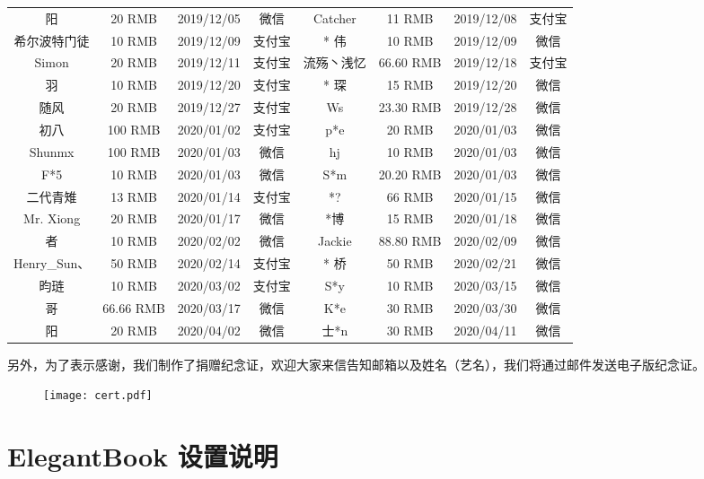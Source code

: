 \documentclass[cn,11pt]{elegantbook}
\begin{document}
\begin{table}[!htb]
\begin{tabular}{*{4}{>{\scriptsize}c}|*{4}{>{\scriptsize}c}}
    * 阳   & 20 RMB & 2019/12/05 & 微信    & Catcher & 11 RMB & 2019/12/08 & 支付宝 \\
    希尔波特门徒 & 10 RMB & 2019/12/09 & 支付宝   & * 伟   & 10 RMB & 2019/12/09 & 微信 \\
    Simon & 20 RMB & 2019/12/11 & 支付宝   & 流殇丶浅忆 & 66.60 RMB & 2019/12/18 & 支付宝 \\
    羽     & 10 RMB & 2019/12/20 & 支付宝   & * 琛   & 15 RMB & 2019/12/20 & 微信 \\
    随风    & 20 RMB & 2019/12/27 & 支付宝   & Ws    & 23.30 RMB & 2019/12/28 & 微信 \\
    初八    & 100 RMB  & 2020/01/02 & 支付宝   & p*e   & 20 RMB & 2020/01/03 & 微信 \\
    Shunmx & 100 RMB & 2020/01/03 & 微信    & hj    & 10 RMB & 2020/01/03 & 微信 \\
    F*5   & 10 RMB & 2020/01/03 & 微信    & S*m   & 20.20 RMB & 2020/01/03 & 微信 \\
    二代青雉  & 13 RMB & 2020/01/14 & 支付宝   & *?    & 66 RMB & 2020/01/15 & 微信 \\
    Mr. Xiong & 20 RMB & 2020/01/17 & 微信    & *博    & 15 RMB & 2020/01/18 & 微信 \\
    * 者  & 10 RMB & 2020/02/02 & 微信    & Jackie  &  88.80 RMB  &  2020/02/09 & 微信 \\
    Henry\_Sun、 & 50 RMB & 2020/02/14 & 支付宝 & * 桥  & 50 RMB & 2020/02/21 & 微信 \\
    昀琏 & 10 RMB & 2020/03/02 & 支付宝 & S*y  &  10 RMB  &  2020/03/15 & 微信 \\
    * 哥  & 66.66 RMB & 2020/03/17 & 微信    &   K*e & 30 RMB & 2020/03/30 & 微信\\
    * 阳  &  20 RMB  &  2020/04/02 & 微信 & 士*n  & 30 RMB & 2020/04/11 & 微信 \\
    \hline
    \end{tabular}%
  \label{tab:donation}%
\end{table}%

另外，为了表示感谢，我们制作了捐赠纪念证，欢迎大家来信告知邮箱以及姓名（艺名），我们将通过邮件发送电子版纪念证。

\begin{figure}[!htbp]
\centering
\texttt{[image: cert.pdf]}
\end{figure}

\chapter{ElegantBook 设置说明}
\end{document}
